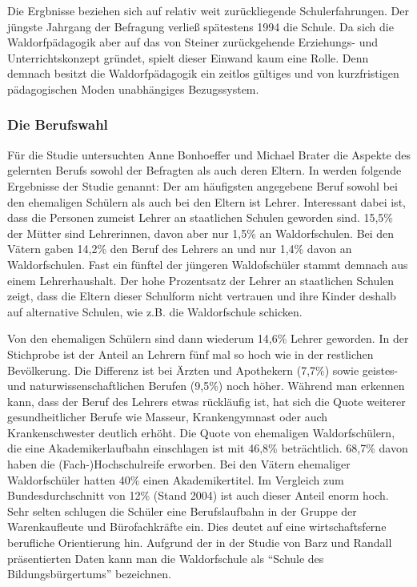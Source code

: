 Die Ergbnisse beziehen sich auf relativ weit zurückliegende Schulerfahrungen. Der jüngste Jahrgang der Befragung verließ spätestens 1994 die Schule. Da sich die Waldorfpädagogik aber auf das von Steiner zurückgehende Erziehungs- und Unterrichtskonzept gründet, spielt dieser Einwand kaum eine Rolle. Denn demnach besitzt die Waldorfpädagogik ein zeitlos gültiges und von kurzfristigen pädagogischen Moden unabhängiges Bezugssystem. \citep[Vgl.][S. 16]{randoll07}

\subsubsection{Die Berufswahl}
\label{subsub:Berufswahl}

Für die Studie untersuchten Anne Bonhoeffer und Michael Brater die Aspekte des gelernten Berufs sowohl der Befragten als auch deren Eltern. In \citet[][S. 16f]{randoll07} werden folgende Ergebnisse der Studie genannt: Der am häufigsten angegebene Beruf sowohl bei den ehemaligen Schülern als auch bei den Eltern ist Lehrer. Interessant dabei ist, dass die Personen zumeist Lehrer an staatlichen Schulen geworden sind. 15,5\% der Mütter sind Lehrerinnen, davon aber nur 1,5\% an Waldorfschulen. Bei den Vätern gaben 14,2\% den Beruf des Lehrers an und nur 1,4\% davon an Waldorfschulen. Fast ein fünftel der jüngeren Waldofschüler stammt demnach aus einem Lehrerhaushalt. Der hohe Prozentsatz der Lehrer an staatlichen Schulen zeigt, dass die Eltern dieser Schulform nicht vertrauen und ihre Kinder deshalb auf alternative Schulen, wie z.B. die Waldorfschule schicken.

Von den ehemaligen Schülern sind dann wiederum 14,6\% Lehrer geworden. In der Stichprobe ist der Anteil an Lehrern fünf mal so hoch wie in der restlichen Bevölkerung. Die Differenz ist bei Ärzten und Apothekern (7,7\%) sowie geistes- und naturwissenschaftlichen Berufen (9,5\%) noch höher. Während man erkennen kann, dass der Beruf des Lehrers etwas rückläufig ist, hat sich die Quote weiterer gesundheitlicher Berufe wie Masseur, Krankengymnast oder auch Krankenschwester deutlich erhöht. Die Quote von ehemaligen Waldorfschülern, die eine Akademikerlaufbahn einschlagen ist mit 46,8\% beträchtlich. 68,7\% davon haben die (Fach-)Hochschulreife erworben. Bei den Vätern ehemaliger Waldorfschüler hatten 40\% einen Akademikertitel. Im Vergleich zum Bundesdurchschnitt von 12\% (Stand 2004) ist auch dieser Anteil enorm hoch. Sehr selten schlugen die Schüler eine Berufslaufbahn in der Gruppe der Warenkaufleute und Bürofachkräfte ein. Dies deutet auf eine wirtschaftsferne berufliche Orientierung hin. Aufgrund der in der Studie von Barz und Randall präsentierten Daten kann man die Waldorfschule als \enquote{Schule des Bildungsbürgertums} bezeichnen. \citep[][S. 17]{randoll07} 

